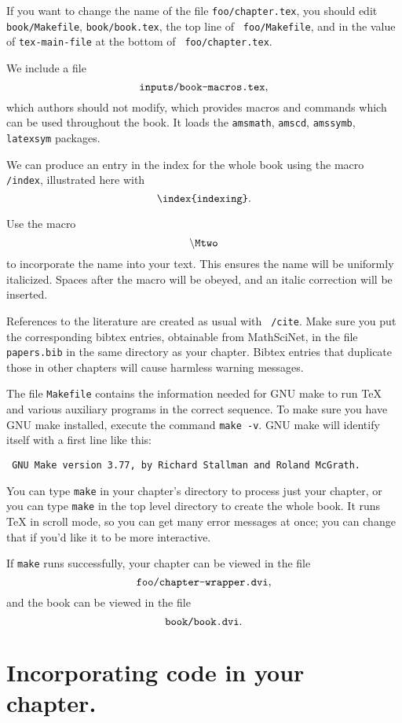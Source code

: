 If you want to change the name of the file {\tt foo/chapter.tex}, you should
edit {\tt book/Makefile}, {\tt book/book.tex}, the top line of {\tt
foo/Makefile}, and in the value of {\tt tex-main-file} at the bottom of {\tt
foo/chapter.tex}.

We include a file $$\text{\tt inputs/book-macros.tex},$$ which authors should not
modify, which provides macros and commands which can be used throughout the
book.  It loads the {\tt amsmath}, {\tt amscd}, {\tt amssymb}, {\tt
latexsym} packages.

We can produce an entry in the index for the whole book using the macro {\tt
\slash index}, illustrated here with  $$\text{\tt
\slash index\char`\{indexing\char`\}}.$$

Use the macro $${\tt \slash Mtwo}$$ to incorporate the name \Mtwo into
your text.  This ensures the name will be uniformly italicized.  Spaces after
the macro will be obeyed, and an italic correction will be inserted.

References to the literature \cite{MR47:3318} are created as usual with {\tt
\slash cite}.  Make sure you put the corresponding bibtex entries,
obtainable from MathSciNet, in the file {\tt papers.bib} in the same
directory as your chapter.  Bibtex entries that duplicate those in other
chapters will cause harmless warning messages.

The file {\tt Makefile} contains the information needed for GNU make to run
TeX and various auxiliary programs in the correct sequence.  To make sure you
have GNU make installed, execute the command {\tt make -v}.  GNU make will
identify itself with a first line like this:
\par\smallskip
\centerline{\tt
GNU Make version 3.77, by Richard Stallman and Roland McGrath.
}
\smallskip\noindent
You can type {\tt make} in your chapter's directory to process just your
chapter, or you can type {\tt make} in the top level directory to create the
whole book.  It runs TeX in scroll mode, so you can get many error messages
at once; you can change that if you'd like it to be more interactive.

If {\tt make} runs successfully, your chapter can be viewed in the file $$\text{\tt
foo/chapter-wrapper.dvi},$$ and the book can be viewed in the file $$\text{\tt
book/book.dvi}.$$

\section{Incorporating \Mtwo code in your chapter.}

